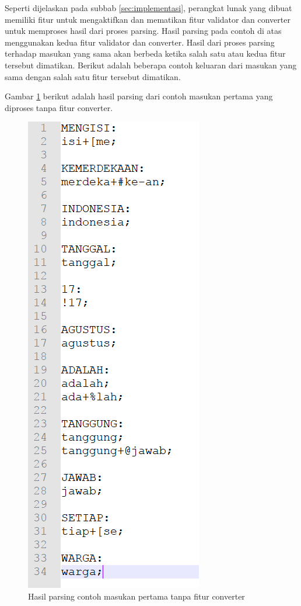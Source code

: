 Seperti dijelaskan pada subbab \ref{sec:implementasi}, perangkat lunak yang dibuat memiliki fitur untuk mengaktifkan dan mematikan fitur validator dan converter untuk memproses hasil dari proses parsing. Hasil parsing pada contoh di atas menggunakan kedua fitur validator dan converter. Hasil dari proses parsing terhadap masukan yang sama akan berbeda ketika salah satu atau kedua fitur tersebut dimatikan. Berikut adalah beberapa contoh keluaran dari masukan yang sama dengan salah satu fitur tersebut dimatikan.

Gambar \ref{hasil-parsing-tanpa-converter} berikut adalah hasil parsing dari contoh masukan pertama yang diproses tanpa fitur converter.

\begin{figure}[H]
\centering
\includegraphics[scale=0.7]{Gambar/hasil-parsing-tanpa-converter}
\caption{Hasil parsing contoh masukan pertama tanpa fitur converter} 
\label{hasil-parsing-tanpa-converter}
\end{figure}

